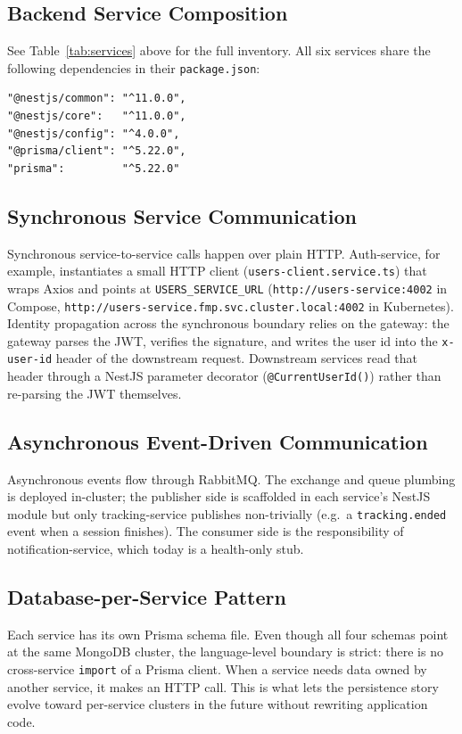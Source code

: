 \documentclass[11pt,a4paper]{article}
\begin{document}
\subsection{Backend Service Composition}
See Table~\ref{tab:services} above for the full inventory.  All six
services share the following dependencies in their
\texttt{package.json}:

\begin{lstlisting}
"@nestjs/common": "^11.0.0",
"@nestjs/core":   "^11.0.0",
"@nestjs/config": "^4.0.0",
"@prisma/client": "^5.22.0",
"prisma":         "^5.22.0"
\end{lstlisting}

\subsection{Synchronous Service Communication}
Synchronous service-to-service calls happen over plain HTTP.
Auth-service, for example, instantiates a small HTTP client
(\texttt{users-client.service.ts}) that wraps Axios and points at
\texttt{USERS\_SERVICE\_URL} (\texttt{http://users-service:4002} in
Compose, \texttt{http://users-service.fmp.svc.cluster.local:4002} in
Kubernetes).  Identity propagation across the synchronous boundary
relies on the gateway: the gateway parses the JWT, verifies the
signature, and writes the user id into the \texttt{x-user-id} header
of the downstream request.  Downstream services read that header
through a NestJS parameter decorator (\texttt{@CurrentUserId()})
rather than re-parsing the JWT themselves.

\subsection{Asynchronous Event-Driven Communication}
Asynchronous events flow through RabbitMQ.  The exchange and queue
plumbing is deployed in-cluster; the publisher side is scaffolded in
each service's NestJS module but only tracking-service publishes
non-trivially (e.g.\ a \texttt{tracking.ended} event when a session
finishes).  The consumer side is the responsibility of
notification-service, which today is a health-only stub.

\subsection{Database-per-Service Pattern}
Each service has its own Prisma schema file.  Even though all four
schemas point at the same MongoDB cluster, the language-level
boundary is strict: there is no cross-service \texttt{import} of a
Prisma client.  When a service needs data owned by another service,
it makes an HTTP call.  This is what lets the persistence story
evolve toward per-service clusters in the future without rewriting
application code.
\end{document}
